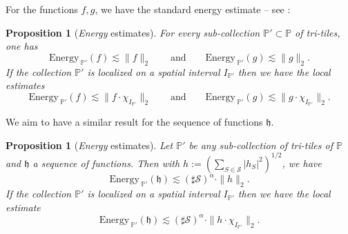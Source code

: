 \documentclass[a4paper,11pt,oneside]{amsart}
\newcommand{\hh}{\mathfrak{h}}
\newcommand{\PP}{\mathbb{P}}
\newcommand{\energy}{\mathrm{Energy \,}}
\theoremstyle{plain}
\newtheorem{proposition}[theorem]{Proposition}
\theoremstyle{definition}
\begin{document}
For the functions $f,g$, we have the standard energy estimate -- see \cite[Propositions 3.6 and 5.1]{BB}:

\begin{proposition}[{\it Energy} estimates] \label{prop:energy1} For every sub-collection $\PP'\subset \PP$ of tri-tiles, one has
$$ \energy_{\PP'}(f)\lesssim \|f\|_2 \qquad \textrm{and} \qquad \energy_{\PP'}(g) \lesssim \|g\|_2.$$
If the collection $\PP'$ is localized on a spatial interval $I_{\PP'}$ then we have the local estimates
$$ \energy_{\PP'}(f)\lesssim \|f \cdot \chi_{I_{\PP'}}\|_2 \qquad \textrm{and} \qquad \energy_{\PP'}(g) \lesssim \|g \cdot \chi_{I_{\PP'}}\|_2.$$
\end{proposition}

We aim to have a similar result for the sequence of functions $\hh$.


\begin{proposition}[{\it Energy} estimates] \label{prop:energy2} Let $\PP'$ be any sub-collection of tri-tiles of $\PP$ and $\hh$ a sequence of functions. Then with $h:=(\sum_{S\in {\mathcal S}} |h_S|^2)^{1/2}$, we have
$$ \energy_{\PP'}(\hh) \lesssim  (\sharp {\mathcal S})^{\alpha} \cdot \|h\|_2.$$
If the collection $\PP'$ is localized on a spatial interval $I_{\PP'}$ then we have the local estimate
$$ \energy_{\PP'}(\hh) \lesssim  (\sharp {\mathcal S})^{\alpha} \cdot \|h \cdot \chi_{I_{\PP'}}\|_2.$$
\end{proposition}
\end{document}
